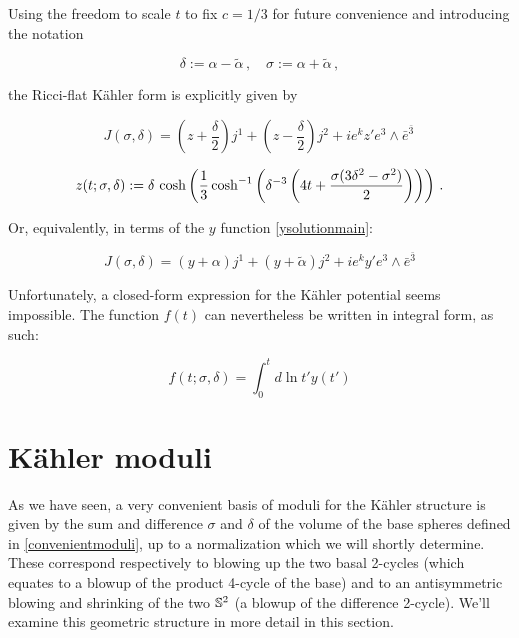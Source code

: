 Using the freedom to scale $t$ to fix $c=1/3$ for future convenience and introducing the notation 

\begin{equation}\label{convenientmoduli}
	\delta := \alpha - \tilde{\alpha}\,,\quad \sigma := \alpha + \tilde{\alpha}\,,
\end{equation}

the Ricci-flat K\"ahler form is explicitly given by

\begin{equation}
	J(\sigma,\delta) = \left(  z + \frac{\delta}{2}\right) j^1 + \left(z-\frac{\delta}{2}\right) j^2 + ie^k z' e^3 \wedge \bar e^{\bar 3}\,
	\label{}
\end{equation}

\begin{equation}
	z(t;\sigma,\delta) := \delta \,\cosh \left( \frac{1}{3} \cosh^{-1} \left(  \delta^{-3} \left( 4t + \frac{\sigma(3\delta^2 - \sigma^2)}{2} \right)  \right) \right) \,.
	\label{}
\end{equation}

Or, equivalently, in terms of the $y$ function \eqref{ysolutionmain}:

\begin{equation}
	J(\sigma,\delta) = (y+\alpha) j^1 + (y+\tilde{\alpha})j^2 + ie^k y' e^3 \wedge \bar e^{\bar 3}
	\label{}
\end{equation}

Unfortunately, a closed-form expression for the K\"ahler potential seems impossible. The function $f(t)$ can nevertheless be written in integral form, as such:

\begin{equation}
	f(t;\sigma,\delta) = \int_0^{t} d\ln t' y(t')
	\label{}
\end{equation}

\section{K\"ahler moduli}

As we have seen, a very convenient basis of moduli for the K\"ahler structure is given by the sum and difference $\sigma$ and $\delta$ of the volume of the base spheres defined in \eqref{convenientmoduli}, up to a normalization which we will shortly determine. These correspond respectively to blowing up the two basal 2-cycles (which equates to a blowup of the product 4-cycle of the base) and to an antisymmetric blowing and shrinking of the two $\mathbb{S}^2$ (a blowup of the difference 2-cycle). We'll examine this geometric structure in more detail in this section.

